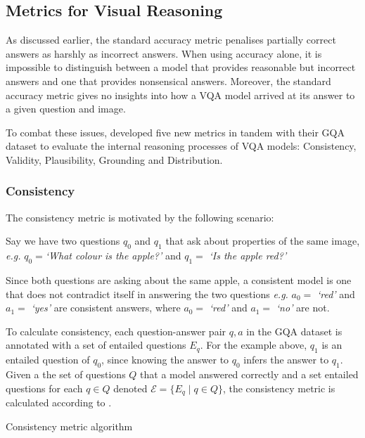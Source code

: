 \subsection{Metrics for Visual Reasoning}

As discussed earlier, the standard accuracy metric penalises partially correct answers as harshly as incorrect answers. When using accuracy alone, it is impossible to distinguish between a model that provides reasonable but incorrect answers and one that provides nonsensical answers. Moreover, the standard accuracy metric gives no insights into how a VQA model arrived at its answer to a given question and image.

To combat these issues, \citeauthor{hudson2019gqa} developed five new metrics in tandem with their GQA dataset \cite{hudson2019gqa} to evaluate the internal reasoning processes of VQA models: Consistency, Validity, Plausibility, Grounding and Distribution.

\subsubsection{Consistency}

The consistency metric is motivated by the following scenario:

Say we have two questions \(q_0\) and \(q_1\) that ask about properties of the same image, \textit{e.g.} \(q_0 = \)\textit{`What colour is the apple?'} and  \(q_1 = \) \textit{`Is the apple red?'}

Since both questions are asking about the same apple, a consistent model is one that does not contradict itself in answering the two questions \textit{e.g.} \(a_0 =\) \textit{`red'} and \(a_1 =\) \textit{`yes'} are consistent answers, where \(a_0 =\) \textit{`red'} and \(a_1 =\) \textit{`no'} are not.

To calculate consistency, each question-answer pair \(q, a\) in the GQA dataset is annotated with a set of entailed questions \(E_q\). For the example above, \(q_1\) is an entailed question of \(q_0\), since knowing the answer to \(q_0\) infers the answer to \(q_1\). Given a the set of questions \(Q\) that a model answered correctly and a set entailed questions for each \(q \in Q\) denoted \(\mathcal{E} = \{E_q \mid q \in Q\}\), the consistency metric is calculated according to \algorithmcfname{ \ref{algorithm:consistency_metric}}.

\begin{algorithm}[htbp]
    \caption[Consistency metric algorithm]{Consistency metric algorithm}
    \label{algorithm:consistency}
\end{algorithm}

